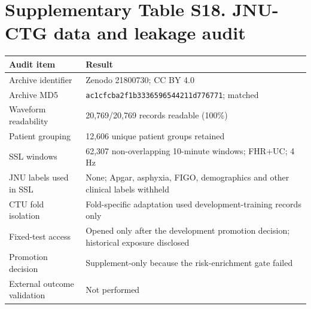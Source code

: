 \documentclass[11pt]{article}
\begin{document}
\section*{Supplementary Table S18. JNU-CTG data and leakage audit}
\begin{tabularx}{\textwidth}{p{5.1cm}X}
\toprule
Audit item & Result \\
\midrule
Archive identifier & Zenodo 21800730; CC BY 4.0 \\
Archive MD5 & \texttt{ac1cfcba2f1b3336596544211d776771}; matched \\
Waveform readability & 20,769/20,769 records readable (100\%) \\
Patient grouping & 12,606 unique patient groups retained \\
SSL windows & 62,307 non-overlapping 10-minute windows; FHR+UC; 4 Hz \\
JNU labels used in SSL & None; Apgar, asphyxia, FIGO, demographics and other clinical labels withheld \\
CTU fold isolation & Fold-specific adaptation used development-training records only \\
Fixed-test access & Opened only after the development promotion decision; historical exposure disclosed \\
Promotion decision & Supplement-only because the risk-enrichment gate failed \\
External outcome validation & Not performed \\
\bottomrule
\end{tabularx}
\end{document}
